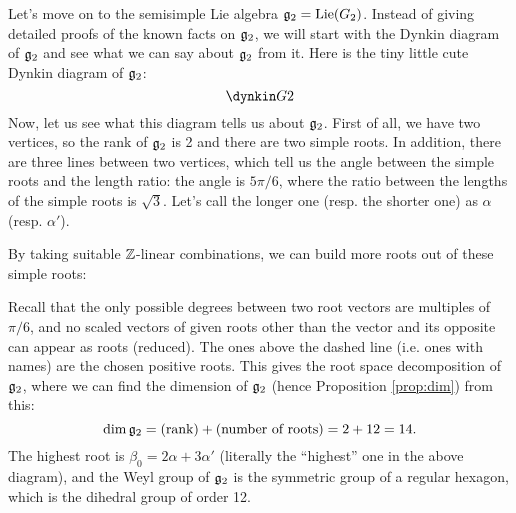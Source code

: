 Let's move on to the semisimple Lie algebra $\mathfrak{g}_2 = \mathrm{Lie}(G_2)$.
Instead of giving detailed proofs of the known facts on $\mathfrak{g}_2$, we will start with the Dynkin diagram of $\mathfrak{g}_2$ and see what we can say about $\mathfrak{g}_2$ from it.
Here is the tiny little cute Dynkin diagram of $\mathfrak{g}_2$:
$$
\dynkin G2
$$
Now, let us see what this diagram tells us about $\mathfrak{g}_2$.
First of all, we have two vertices, so the rank of $\mathfrak{g}_2$ is 2 and there are two simple roots.
In addition, there are three lines between two vertices, which tell us the angle between the simple roots and the length ratio: the angle is $5\pi / 6$, where the ratio between the lengths of the simple roots is $\sqrt{3}$.
Let's call the longer one (resp. the shorter one) as $\alpha$ (resp. $\alpha'$).


\begin{center}
\end{center}
By taking suitable $\mathbb{Z}$-linear combinations, we can build more roots out of these simple roots:

\begin{center}
\end{center}
Recall that the only possible degrees between two root vectors are multiples of $\pi/6$, and no scaled vectors of given roots other than the vector and its opposite can appear as roots (reduced).
The ones above the dashed line (i.e. ones with names) are the chosen positive roots.
This gives the root space decomposition of $\mathfrak{g}_2$, where we can find the dimension of $\mathfrak{g}_2$ (hence Proposition \ref{prop:dim}) from this:
$$
\dim \mathfrak{g}_2 = \text{(rank)} + \text{(number of roots)} = 2 + 12 = 14.
$$
The highest root is $\beta_0 = 2 \alpha + 3 \alpha'$ (literally the ``highest'' one in the above diagram), and the Weyl group of $\mathfrak{g}_2$ is the symmetric group of a regular hexagon, which is the dihedral group of order 12.


